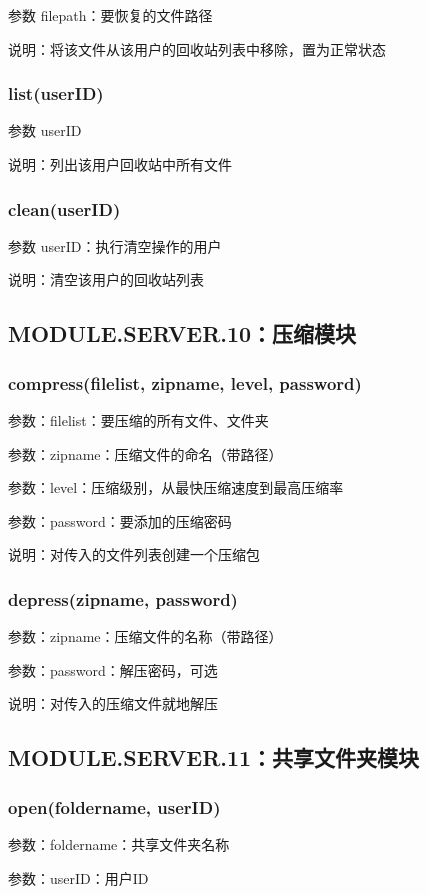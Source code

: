 参数 filepath：要恢复的文件路径

说明：将该文件从该用户的回收站列表中移除，置为正常状态

\subsubsection{list(userID)}
参数 userID

说明：列出该用户回收站中所有文件

\subsubsection{clean(userID)}
参数 userID：执行清空操作的用户

说明：清空该用户的回收站列表

\subsection{MODULE.SERVER.10：压缩模块}
\subsubsection{compress(filelist, zipname, level, password)}

参数：filelist：要压缩的所有文件、文件夹

参数：zipname：压缩文件的命名（带路径）

参数：level：压缩级别，从最快压缩速度到最高压缩率

参数：password：要添加的压缩密码

说明：对传入的文件列表创建一个压缩包

\subsubsection{depress(zipname, password)}
参数：zipname：压缩文件的名称（带路径）

参数：password：解压密码，可选

说明：对传入的压缩文件就地解压

\subsection{MODULE.SERVER.11：共享文件夹模块}
\subsubsection{open(foldername, userID)}
参数：foldername：共享文件夹名称

参数：userID：用户ID

